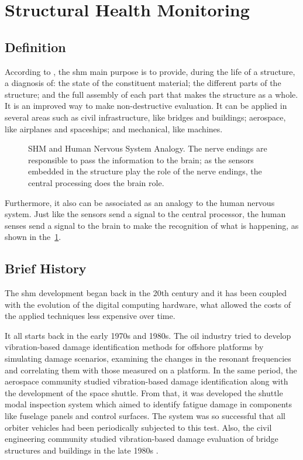 \section{Structural Health Monitoring}

\subsection{Definition}

According to  \citet{balageas2010}, the \gls*{shm} main purpose is to provide, during the life of a structure,  a diagnosis of: the state of the constituent material; the different parts of the structure; and the full assembly of each part that makes the structure as a whole. 
It is an improved way to make non-destructive evaluation.
It can be applied in several areas such as civil infrastructure, like bridges and buildings; aerospace, like airplanes and spaceships; and mechanical, like machines.
%
\begin{figure}[!htb]
    \centering
    
    \caption[SHM and Human Nervous System Analogy]{SHM and Human Nervous System Analogy. The nerve endings are responsible to pass the information to the brain; as the sensors embedded in the structure play the role of the nerve endings, the central processing does the brain role.}
    \label{fig:shm_nervous_system}
\end{figure}

Furthermore, it also can be associated as an analogy to the human nervous system. 
Just like the sensors send a signal to the central processor, the human senses send a signal to the brain to make the recognition of what is happening, as shown in the~\cref{fig:shm_nervous_system}.

\subsection{Brief History}

The \gls*{shm} development began back in the 20th century and it has been coupled with the evolution of the digital computing hardware, what allowed the costs of the applied techniques less expensive over time.

It all starts back in the early 1970s and 1980s. 
The oil industry tried to develop vibration-based damage identification methods for offshore platforms by simulating damage scenarios, examining the changes in the resonant frequencies and correlating them with those measured on a platform.
In the same period, the aerospace community studied vibration-based damage identification along with the development of the space shuttle. 
From that, it was developed the shuttle modal inspection system which aimed to identify fatigue damage in components like fuselage panels and control surfaces. The system was so successful that all orbiter vehicles had been periodically subjected to this test.
Also, the civil engineering community studied vibration-based damage evaluation of bridge structures and buildings in the late 1980s \citep{farrar2007}.

